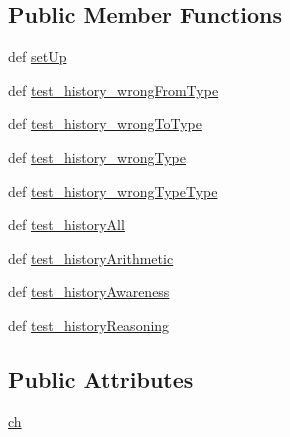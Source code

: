 \subsection*{Public Member Functions}
\begin{DoxyCompactItemize}
\item 
def \hyperlink{classcognitive__test__user__history__tests_1_1CognitiveTestHistoryTests_ab2576ff4c529221aabc6bbcab28f142a}{set\-Up}
\item 
def \hyperlink{classcognitive__test__user__history__tests_1_1CognitiveTestHistoryTests_ace23774e6582aac05540fecc5d69c26d}{test\-\_\-history\-\_\-wrong\-From\-Type}
\item 
def \hyperlink{classcognitive__test__user__history__tests_1_1CognitiveTestHistoryTests_afabf1c8d3ada150962687a4a2c662e1d}{test\-\_\-history\-\_\-wrong\-To\-Type}
\item 
def \hyperlink{classcognitive__test__user__history__tests_1_1CognitiveTestHistoryTests_a9cf147862f7b8f3092b756bfccfc3b14}{test\-\_\-history\-\_\-wrong\-Type}
\item 
def \hyperlink{classcognitive__test__user__history__tests_1_1CognitiveTestHistoryTests_ade20b99aef46ed2ff2f62ed0d0f90853}{test\-\_\-history\-\_\-wrong\-Type\-Type}
\item 
def \hyperlink{classcognitive__test__user__history__tests_1_1CognitiveTestHistoryTests_aac525cb72a5950bd15af34f56bedcce5}{test\-\_\-history\-All}
\item 
def \hyperlink{classcognitive__test__user__history__tests_1_1CognitiveTestHistoryTests_a6abf44b4aa3e18a9f34a716389cbaaff}{test\-\_\-history\-Arithmetic}
\item 
def \hyperlink{classcognitive__test__user__history__tests_1_1CognitiveTestHistoryTests_a8e2882543ae5f0308b192dcea7f11094}{test\-\_\-history\-Awareness}
\item 
def \hyperlink{classcognitive__test__user__history__tests_1_1CognitiveTestHistoryTests_abf5dd34eab07d4f4d7b482ba2ce2faa1}{test\-\_\-history\-Reasoning}
\end{DoxyCompactItemize}
\subsection*{Public Attributes}
\begin{DoxyCompactItemize}
\item 
\hyperlink{classcognitive__test__user__history__tests_1_1CognitiveTestHistoryTests_a39fdfa24cf3e9fb430f852512aa9146b}{ch}
\end{DoxyCompactItemize}


